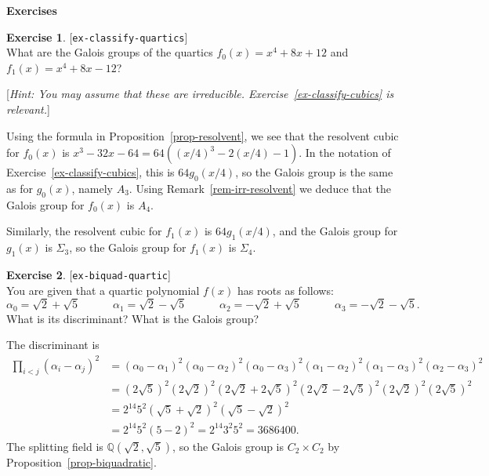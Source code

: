 \documentclass{amsart}
\newcommand{\Q}         {{\mathbb{Q}}}
\newcommand{\al}        {\alpha}
\newcommand{\Sg}        {\Sigma}
\newcommand{\tm}        {\times}
\renewcommand{\:}{\colon}
\newcommand{\lastexlabel}{}
\newcommand{\exlabel}[1]{
 \global\def\lastexlabel{#1}\label{#1}[\texttt{#1}]\ \\
}
\newcommand{\exlabel}[1]{
 \global\def\lastexlabel{#1}\label{#1}
}
\newenvironment{solution}{\SolutionInline}{\endSolutionInline}
\theoremstyle{definition}
\newtheorem{exercise}{Exercise}[section]
\renewenvironment{solution}{\SolutionAtEnd}{\endSolutionAtEnd}
\begin{document}

\begin{center}
 \Large \textbf{Exercises}
\end{center}

\begin{exercise}\exlabel{ex-classify-quartics}
 What are the Galois groups of the quartics $f_0(x)=x^4+8x+12$ 
 and $f_1(x)=x^4+8x-12$?  

 [{\sl Hint: You may assume that these are irreducible.
  Exercise~\ref{ex-classify-cubics} is relevant.}]
\end{exercise}
\begin{solution}
 Using the formula in Proposition~\ref{prop-resolvent}, we see
 that the resolvent cubic for $f_0(x)$ is
 $x^3-32x-64=64((x/4)^3-2(x/4)-1)$.  In the notation of
 Exercise~\ref{ex-classify-cubics}, this is $64 g_0(x/4)$, so the
 Galois group is the same as for $g_0(x)$, namely $A_3$.  Using
 Remark~\ref{rem-irr-resolvent} we deduce that the Galois group for
 $f_0(x)$ is $A_4$.  

 Similarly, the resolvent cubic for $f_1(x)$ is $64 g_1(x/4)$, and the
 Galois group for $g_1(x)$ is $\Sg_3$, so the Galois group for
 $f_1(x)$ is $\Sg_4$.
\end{solution}
\begin{exercise}\exlabel{ex-biquad-quartic}
 You are given that a quartic polynomial $f(x)$ has roots as follows:
 \[ \al_0 =  \sqrt{2}+\sqrt{5} \hspace{3em}
    \al_1 =  \sqrt{2}-\sqrt{5} \hspace{3em}
    \al_2 = -\sqrt{2}+\sqrt{5} \hspace{3em}
    \al_3 = -\sqrt{2}-\sqrt{5}.
 \]
 What is its discriminant? What is the Galois group?
\end{exercise}
\begin{solution}
 The discriminant is 
 \begin{align*}
   \prod_{i<j}(\al_i-\al_j)^2
    &= (\al_0-\al_1)^2(\al_0-\al_2)^2(\al_0-\al_3)^2
       (\al_1-\al_2)^2(\al_1-\al_3)^2(\al_2-\al_3)^2 \\
    &= (2\sqrt{5})^2 (2\sqrt{2})^2 (2\sqrt{2}+2\sqrt{5})^2
       (2\sqrt{2}-2\sqrt{5})^2 (2\sqrt{2})^2 (2\sqrt{5})^2 \\
    &= 2^{14}5^2 (\sqrt{5}+\sqrt{2})^2(\sqrt{5}-\sqrt{2})^2 \\
    &= 2^{14}5^2 (5-2)^2 = 2^{14} 3^2 5^2 = 3686400.
 \end{align*}
 The splitting field is $\Q(\sqrt{2},\sqrt{5})$, so the Galois group
 is $C_2\tm C_2$ by Proposition~\ref{prop-biquadratic}.
\end{solution}
\end{document}
